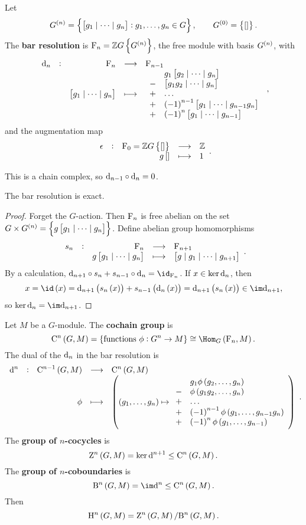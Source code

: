 \begin{definition}
Let
$$ G^{\br{n}} = \cbr{\sbr{g_1 \mid \dots \mid g_n} : g_1, \dots, g_n \in G}, \qquad G^{\br{0}} = \cbr{\sbr{}}. $$
The \textbf{bar resolution} is $ \F_n = \ZZ G\cbr{G^{\br{n}}} $, the free module with basis $ G^{\br{n}} $, with
$$ \function[\d_n]{\F_n}{\F_{n - 1}}{\sbr{g_1 \mid \dots \mid g_n}}{
\begin{array}{rl}
& g_1\sbr{g_2 \mid \dots \mid g_n} \\
- & \sbr{g_1g_2 \mid \dots \mid g_n} \\
+ & \dots \\
+ & \br{-1}^{n - 1}\sbr{g_1 \mid \dots \mid g_{n - 1}g_n} \\
+ & \br{-1}^n\sbr{g_1 \mid \dots \mid g_{n - 1}}
\end{array}
}, $$
and the augmentation map
$$ \function[\epsilon]{\F_0 = \ZZ G\cbr{\sbr{}}}{\ZZ}{g\sbr{}}{1}. $$
\end{definition}

\begin{fact}
This is a chain complex, so $ \mathrm{d}_{n - 1} \circ \mathrm{d}_n = 0 $.
\end{fact}

\begin{proposition}
The bar resolution is exact.
\end{proposition}

\begin{proof}
Forget the $ G $-action. Then $ \mathrm{F}_n $ is free abelian on the set $ G \times G^{\br{n}} = \cbr{g\sbr{g_1 \mid \dots \mid g_n}} $. Define abelian group homomorphisms
$$ \function[s_n]{\F_n}{\F_{n + 1}}{g\sbr{g_1 \mid \dots \mid g_n}}{\sbr{g \mid g_1 \mid \dots \mid g_{n + 1}}}. $$
By a calculation, $ \d_{n + 1} \circ s_n + s_{n - 1} \circ \d_n = \id_{\F_n} $. If $ x \in \ker \mathrm{d}_n $, then
$$ x = \id\br{x} = \d_{n + 1}\br{s_n\br{x}} + s_{n - 1}\br{\d_n\br{x}} = \d_{n + 1}\br{s_n\br{x}} \in \im \d_{n + 1}, $$
so $ \ker \d_n = \im \d_{n + 1} $.
\end{proof}

\pagebreak

Let $ M $ be a $ G $-module. The \textbf{cochain group} is
$$ \C^n\br{G, M} = \cbr{\text{functions} \ \phi : G^n \to M} \cong \Hom_G\br{\F_n, M}. $$
The dual of the $ \mathrm{d}_n $ in the bar resolution is
$$ \function[\d^n]{\C^{n - 1}\br{G, M}}{\C^n\br{G, M}}{\phi}{\br{\br{g_1, \dots, g_n} \mapsto
\begin{array}{rl}
& g_1\phi\br{g_2, \dots, g_n} \\
- & \phi\br{g_1g_2, \dots, g_n} \\
+ & \dots \\
+ & \br{-1}^{n - 1}\phi\br{g_1, \dots, g_{n - 1}g_n} \\
+ & \br{-1}^n\phi\br{g_1, \dots, g_{n - 1}}
\end{array}
}}. $$
The \textbf{group of $ n $-cocycles} is
$$ \Z^n\br{G, M} = \ker \d^{n + 1} \le \C^n\br{G, M}. $$
The \textbf{group of $ n $-coboundaries} is
$$ \B^n\br{G, M} = \im \d^n \le \C^n\br{G, M}. $$
Then
$$ \H^n\br{G, M} = \Z^n\br{G, M} / \B^n\br{G, M}. $$

